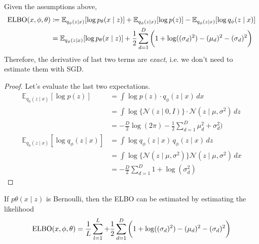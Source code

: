   \begin{theorem}
    Given the assumptions above, 
    \begin{align}
      \elbo(x, \phi, \theta) & \coloneqq \mathbb{E}_{q_\phi(z \mid x)} [ \log p_\theta (x \mid z)] + \mathbb{E}_{q_\phi (z \mid x)} [ \log p(z)] - \mathbb{E}_{q_\phi (z \mid x)} [ \log q_\phi (z \mid x)] \\
                             & = \mathbb{E}_{q_\phi(z \mid x)} [ \log p_\theta (x \mid z)] + \frac{1}{2} \sum_{d=1}^D \bigg( 1 + \log( (\sigma_d)^2 ) - (\mu_d)^2 - (\sigma_d)^2 \bigg)
    \end{align}
    Therefore, the derivative of last two terms are \textit{exact}, i.e. we don't need to estimate them with SGD. 
  \end{theorem}
  \begin{proof}
    Let's evaluate the last two expectations. 
    \begin{align}
      \mathbb{E}_{q_\phi (z \mid x)} [ \log p(z)] & = \int \log p(z) \cdot q_\phi (z \mid x) \,dx \\
                                                  & = \int \log \{\mathcal{N} (z \mid 0, I) \}  \cdot \mathcal{N}(z \mid \mu, \sigma^2) \,dz  \\
                                                  & = - \frac{D}{2} \log (2 \pi) - \frac{1}{2} \sum_{d=1}^D \mu_d^2 + \sigma_d^2) \\
      \mathbb{E}_{q_\phi (z \mid x)} [ \log q_\phi (z \mid x)] & = \int \log q_\phi (z \mid x) \, q_\phi (z \mid x) \,dz \\
                                                               & = \int \log \{ \mathcal{N}(z \mid \mu, \sigma^2) \} \mathcal{N}(z \mid \mu, \sigma^2) \,dx \\
                                                               & = -\frac{D}{2} \sum_{d=1}^D 1 + \log (\sigma_d^2)
    \end{align}
  \end{proof} 

  \begin{corollary}
    If $p\theta (x \mid z)$ is Bernoulli, then the ELBO can be estimated by estimating the likelihood 
    \begin{equation}
      \elbo(x, \phi, \theta) = \frac{1}{L} \sum_{l=1}^L + \frac{1}{2} \sum_{d=1}^D \bigg( 1 + \log( (\sigma_d)^2 ) - (\mu_d)^2 - (\sigma_d)^2 \bigg)
    \end{equation}
  \end{corollary}


